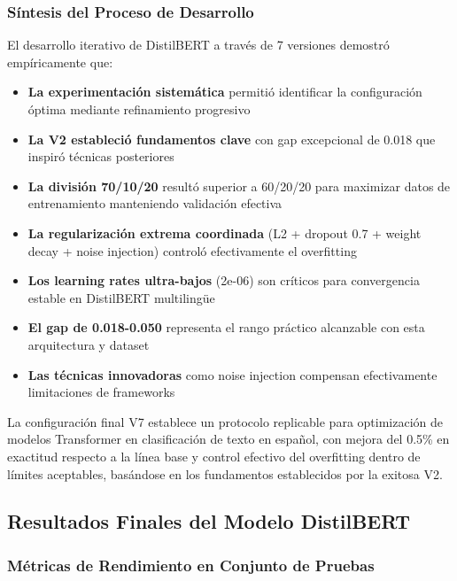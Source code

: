 \subsubsection{Síntesis del Proceso de Desarrollo}

El desarrollo iterativo de DistilBERT a través de 7 versiones demostró empíricamente que:

\begin{itemize}
    \item \textbf{La experimentación sistemática} permitió identificar la configuración óptima mediante refinamiento progresivo
    \item \textbf{La V2 estableció fundamentos clave} con gap excepcional de 0.018 que inspiró técnicas posteriores
    \item \textbf{La división 70/10/20} resultó superior a 60/20/20 para maximizar datos de entrenamiento manteniendo validación efectiva
    \item \textbf{La regularización extrema coordinada} (L2 + dropout 0.7 + weight decay + noise injection) controló efectivamente el overfitting
    \item \textbf{Los learning rates ultra-bajos} (2e-06) son críticos para convergencia estable en DistilBERT multilingüe
    \item \textbf{El gap de 0.018-0.050} representa el rango práctico alcanzable con esta arquitectura y dataset
    \item \textbf{Las técnicas innovadoras} como noise injection compensan efectivamente limitaciones de frameworks
\end{itemize}

La configuración final V7 establece un protocolo replicable para optimización de modelos Transformer en clasificación de texto en español, con mejora del 0.5\% en exactitud respecto a la línea base y control efectivo del overfitting dentro de límites aceptables, basándose en los fundamentos establecidos por la exitosa V2.

\subsection{Resultados Finales del Modelo DistilBERT}
\label{subsec:resultados_finales_distilbert}

\subsubsection{Métricas de Rendimiento en Conjunto de Pruebas}

